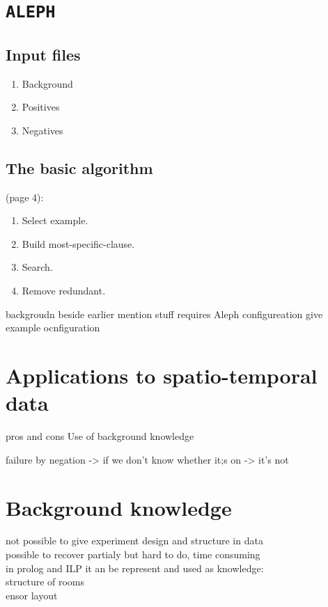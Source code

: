 \documentclass[12pt, a4paper, pdflatex, leqno, twoside, openright]{report}
\begin{document}
  \section{\texttt{ALEPH}}

    \subsection{Input files}
\begin{enumerate}
  \item Background
  \item Positives
  \item Negatives
\end{enumerate}

    \subsection{The basic algorithm}
(page 4):
\begin{enumerate}
  \item Select example.
  \item Build most-specific-clause.
  \item Search.
  \item Remove redundant.
\end{enumerate}


backgroudn beside earlier mention stuff requires Aleph configureation
give example ocnfiguration


  \section{Applications to spatio-temporal data}
pros and cons Use of background knowledge

failure by negation -> if we don't know whether it;s on -> it's not

  \section{Background knowledge}
not possible to give experiment design and structure in data\\
possible to recover partialy but hard to do, time consuming\\

in prolog and ILP it an be represent and used as knowledge:\\
structure of rooms\\
ensor layout\\
\end{document}
